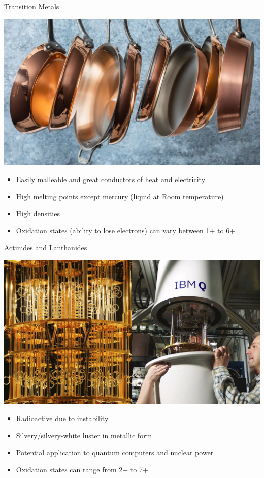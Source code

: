 \documentclass[11pt]{beamer}
\begin{document}
\begin{frame}{Transition Metals}
  \begin{center}
    \includegraphics[scale=0.12]{copper_pan}
  \end{center}
  
  \begin{itemize}
  \item Easily malleable and great conductors of heat and
    electricity
  \item High melting points except mercury (liquid at Room
    temperature)
  \item High densities
  \item Oxidation states (ability to lose electrons) can
    vary between 1+ to 6+
  \end{itemize}
\end{frame}

\begin{frame}{Actinides and Lanthanides}
  \begin{center}
    \includegraphics[scale=0.3]{quantum_comp}
  \end{center}

  \begin{itemize}
  \item Radioactive due to instability
  \item Silvery/silvery-white luster in metallic form
  \item Potential application to quantum computers and
    nuclear power
  \item Oxidation states can range from 2+ to 7+
  \end{itemize}
\end{frame}
\end{document}
